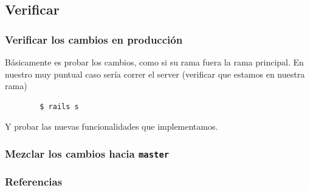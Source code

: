 \documentclass[10pt]{beamer}
\begin{document}
\subsection{Verificar}
\begin{frame}[fragile]
	\frametitle{Verificar los cambios en producción}

	Básicamente es probar los cambios, como si su rama fuera la rama principal.  
	En nuestro muy puntual caso sería correr el server (verificar que estamos 
	en nuestra rama)

	\begin{lstlisting}
		$ rails s
	\end{lstlisting}

	Y probar las nuevas funcionalidades que implementamos.
\end{frame}

\begin{frame}[fragile]
	\frametitle{Mezclar los cambios hacia \texttt{master}}
\end{frame}


\begin{frame}[allowframebreaks]
	\frametitle{Referencias}

	\printbibliography[heading=none]
	\nocite{*}
\end{frame}
\end{document}
